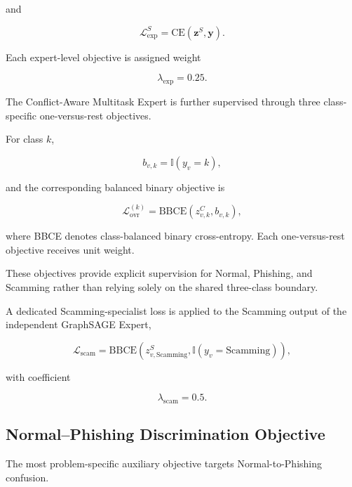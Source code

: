 \documentclass{ieeeaccess}
\begin{document}
and

\begin{equation}
\mathcal{L}^{S}_{\mathrm{exp}}
=
\mathrm{CE}
\left(
\mathbf{z}^{S},
\mathbf{y}
\right).
\end{equation}

Each expert-level objective is assigned weight

\begin{equation}
\lambda_{\mathrm{exp}}=0.25.
\end{equation}

The Conflict-Aware Multitask Expert is further supervised through three class-specific one-versus-rest objectives.

For class \(k\),

\begin{equation}
b_{v,k}
=
\mathbb{I}(y_v=k),
\end{equation}

and the corresponding balanced binary objective is

\begin{equation}
\mathcal{L}^{(k)}_{\mathrm{ovr}}
=
\mathrm{BBCE}
\left(
z^{C}_{v,k},
b_{v,k}
\right),
\end{equation}

where BBCE denotes class-balanced binary cross-entropy. Each one-versus-rest objective receives unit weight.

These objectives provide explicit supervision for Normal, Phishing, and Scamming rather than relying solely on the shared three-class boundary.

A dedicated Scamming-specialist loss is applied to the Scamming output of the independent GraphSAGE Expert,

\begin{equation}
\mathcal{L}_{\mathrm{scam}}
=
\mathrm{BBCE}
\left(
z^{S}_{v,\mathrm{Scamming}},
\mathbb{I}(y_v=\mathrm{Scamming})
\right),
\label{eq:scam_loss}
\end{equation}

with coefficient

\begin{equation}
\lambda_{\mathrm{scam}}=0.5.
\end{equation}


\subsection{Normal--Phishing Discrimination Objective}

The most problem-specific auxiliary objective targets Normal-to-Phishing confusion.
\end{document}
